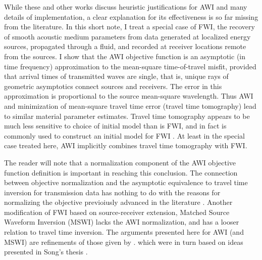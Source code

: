 While these and other works discuss heuristic justifications for AWI
and many details of implementation, a clear explanation for its
effectiveness is so far missing from the literature. In this short
note, I treat a special case of FWI, the recovery of smooth acoustic
medium parameters from data generated at localized energy sources,
propagated through a fluid, and recorded at receiver locations remote
from the sources. I show that the AWI objective function is an
asymptotic (in time frequency) approximation to the mean-square
time-of-travel misfit, provided that arrival times of transmitted
waves are single, that is, unique rays of geometric asymptotics
connect sources and receivers. The error in this approximation is
proportional to the source mean-square wavelength. Thus AWI and
minimization of mean-square travel time error (travel time tomography)
lead to similar material parameter estimates. Travel time tomography
appears to be much less sensitive to choice of initial model than is
FWI, and in fact is commonly used to construct an initial model for
FWI \cite[]{Bordingetal:87,SirguePratt:04,VirieuxOperto:09}. At least
in the special case treated here, AWI implicitly combines travel time
tomography with FWI.

The reader will
note that a normalization component of the AWI objective function
definition is important in reaching this conclusion. The connection
between objective normalization and the asymptotic equivalence to
travel time inversion for transmission data has nothing to do with the
reasons for normalizing the objective previoiusly advanced in the
literature \cite[]{Warner:16,LiAlkhalifah:21}. Another modification of
FWI based on source-receiver extension, Matched Source Waveform Inversion (MSWI)
\cite[]{HuangSymes2015SEG,HuangSymes:Geo17} lacks the AWI
normalization, and has a looser relation to travel time inversion. The
arguments presented here for AWI (and MSWI) are refinements of those
given by \cite{HuangSymes:Geo17}. which were in turn based on ideas
presented in Song's thesis \cite[]{Song:94c}.

